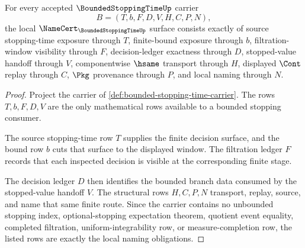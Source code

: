 \begin{theorem}
\label{thm:bounded-stopping-time-namecert-obligations}
For every accepted $\BoundedStoppingTimeUp$ carrier
$$
B=(T,b,F,D,V,H,C,P,N),
$$
the local $\NameCert_{\BoundedStoppingTimeUp}$ surface consists exactly of source stopping-time exposure through $T$, finite-bound exposure through $b$, filtration-window visibility through $F$, decision-ledger exactness through $D$, stopped-value handoff through $V$, componentwise $\hsame$ transport through $H$, displayed $\Cont$ replay through $C$, $\Pkg$ provenance through $P$, and local naming through $N$.
\end{theorem}
\begin{proof}
Project the carrier of \autoref{def:bounded-stopping-time-carrier}. The rows $T,b,F,D,V$ are the only mathematical rows available to a bounded stopping consumer.

The source stopping-time row $T$ supplies the finite decision surface, and the bound row $b$ cuts that surface to the displayed window. The filtration ledger $F$ records that each inspected decision is visible at the corresponding finite stage.

The decision ledger $D$ then identifies the bounded branch data consumed by the stopped-value handoff $V$. The structural rows $H,C,P,N$ transport, replay, source, and name that same finite route. Since the carrier contains no unbounded stopping index, optional-stopping expectation theorem, quotient event equality, completed filtration, uniform-integrability row, or measure-completion row, the listed rows are exactly the local naming obligations.
\end{proof}

